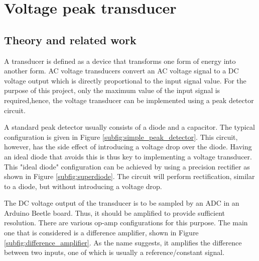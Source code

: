 \chapter{Voltage peak transducer}
\section{Theory and related work} \label{sec:literature_voltage}
A transducer is defined as a device that transforms one form of energy into another form\cite{Neamen:Microelectronics}. AC voltage transducers convert an AC voltage signal to a DC voltage output which is directly proportional to the input signal value. For the purpose of this project, only the maximum value of the input signal is required,hence, the voltage transducer can be implemented using a peak detector circuit.

A standard peak detector usually consists of a diode and a capacitor\cite{Neamen:Microelectronics}. The typical configuration is given in Figure \ref{subfig:simple_peak_detector}. This circuit, however, has the side effect of introducing a voltage drop over the diode. Having an ideal diode that avoids this is thus key to implementing a voltage transducer. This "ideal diode" configuration can be achieved by using a precision rectifier as shown in Figure \ref{subfig:superdiode}. The circuit will perform rectification, similar to a diode, but without introducing a voltage drop\cite{superdiode}. 

The DC voltage output of the transducer is to be sampled by an ADC in an Arduino Beetle board. Thus, it should be amplified to provide sufficient resolution. There are various op-amp configurations for this purpose. The main one that is considered is a difference amplifier, shown in Figure \ref{subfig:difference_amplifier}. As the name suggests, it amplifies the difference between two inputs, one of which is usually a reference/constant signal\cite{difference_amp}.

